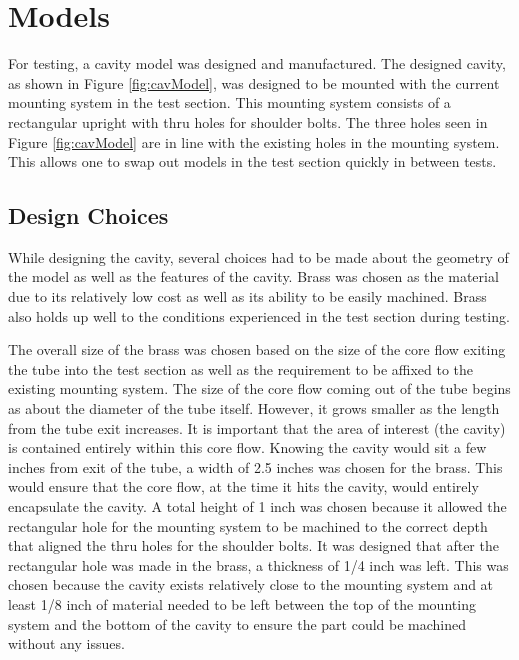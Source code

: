 \section{Models}

For testing, a cavity model was designed and manufactured. The designed cavity, as shown in Figure \ref{fig:cavModel}, was designed to be mounted with the current mounting system in the test section. This mounting system consists of a rectangular upright with thru holes for shoulder bolts. The three holes seen in Figure \ref{fig:cavModel} are in line with the existing holes in the mounting system. This allows one to swap out models in the test section quickly in between tests. 


\subsection{Design Choices}

While designing the cavity, several choices had to be made about the geometry of the model as well as the features of the cavity. Brass was chosen as the material due to its relatively low cost as well as its ability to be easily machined. Brass also holds up well to the conditions experienced in the test section during testing. 

The overall size of the brass was chosen based on the size of the core flow exiting the tube into the test section as well as the requirement to be affixed to the existing mounting system. The size of the core flow coming out of the tube begins as about the diameter of the tube itself. However, it grows smaller as the length from the tube exit increases. It is important that the area of interest (the cavity) is contained entirely within this core flow. Knowing the cavity would sit a few inches from exit of the tube, a width of 2.5 inches was chosen for the brass. This would ensure that the core flow, at the time it hits the cavity, would entirely encapsulate the cavity. A total height of 1 inch was chosen because it allowed the rectangular hole for the mounting system to be machined to the correct depth that aligned the thru holes for the shoulder bolts. It was designed that after the rectangular hole was made in the brass, a thickness of 1/4 inch was left. This was chosen because the cavity exists relatively close to the mounting system and at least 1/8 inch of material needed to be left between the top of the mounting system and the bottom of the cavity to ensure the part could be machined without any issues. 

